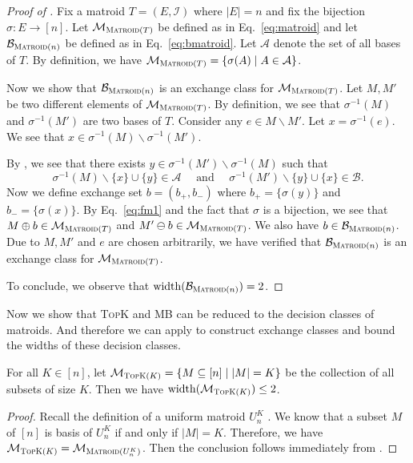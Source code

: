 \documentclass{article}
\newcommand{\M}{\mathcal M}
\newcommand{\B}{\mathcal B}
\newcommand{\del}{\backslash}
\DeclareMathOperator{\rank}{width}
\newcommand{\MultiIdent}{\textsc{TopK}\xspace}
\newcommand{\MultiBandit}{\textsc{MB}\xspace}
\newcommand{\Matroid}{\textsc{Matroid}\xspace}
\begin{document}
\begin{proof}[Proof of ]
Fix a matroid $T=(E,\mathcal I)$ where $|E|=n$ and fix the bijection $\sigma\colon E\rightarrow [n]$.
Let $\M_{\Matroid(T)}$ be defined as in Eq.~\eqref{eq:matroid} and let $\B_{\Matroid(n)}$ be defined as in Eq.~\eqref{eq:bmatroid}.
Let $\mathcal A$ denote the set of all bases of $T$. 
By definition, we have $\M_{\Matroid(T)} = \{\sigma(A) \mid A\in\mathcal A\}$.

Now we show that $\B_{\Matroid(n)}$ is an exchange class for $\M_{\Matroid(T)}$.
Let $M,M'$ be two different elements of $\M_{\Matroid(T)}$. 
By definition, we see that $\sigma^{-1}(M)$ and $\sigma^{-1}(M')$ are two bases of $T$.
Consider any $e\in M\del M'$. Let $x = \sigma^{-1}(e)$. 
We see that $x\in \sigma^{-1}(M) \del \sigma^{-1}(M')$. 

By , we see that there exists $y \in \sigma^{-1}(M') \del \sigma^{-1}(M)$ 
such that 
\begin{equation}
\label{eq:fm1}
\sigma^{-1}(M) \del \{x\} \cup \{y\} \in \mathcal A\quad\text{ and }\quad\sigma^{-1}(M') \del \{y\} \cup \{x\} \in \mathcal B.
\end{equation}
Now we define exchange set $b=(b_+,b_-)$ where $b_+ = \{\sigma(y)\}$ and $b_-=\{\sigma(x)\}$. 
By Eq.~\eqref{eq:fm1} and the fact that $\sigma$ is a bijection, we see that $M\oplus b \in \M_{\Matroid(T)}$ and $M'\ominus b \in \M_{\Matroid(T)}$. We also have $b\in \B_{\Matroid(n)}$.
Due to $M,M'$ and $e$ are chosen arbitrarily, we have verified that $\B_{\Matroid(n)}$ is an exchange class for $\M_{\Matroid(T)}$.

To conclude, we observe that $\rank(\B_{\Matroid(n)}) = 2$.
\end{proof}

Now we show that \MultiIdent and \MultiBandit can be reduced to the decision classes of matroids. 
And therefore we can apply  to construct exchange classes and bound the widths of these decision classes.

\begin{fact}[\MultiIdent]
\label{fact:topk}
For all $K \in [n]$, let $\M_{\MultiIdent(K)} = \{M\subseteq [n] \mid |M| = K\}$ be the collection of all subsets of size $K$.
Then we have $\rank(\M_{\MultiIdent(K)}) \le 2$.
\end{fact}
\begin{proof}
Recall the definition of a uniform matroid $U_n^K$ \citep{oxley2006matroid}. 
We know that a subset $M$ of $[n]$ is basis of $U_n^K$ if and only if $|M|=K$.
Therefore, we have $\M_{\MultiIdent(K)}=\M_{\Matroid(U_n^K)}$. 
Then the conclusion follows immediately from .
\end{proof}
\end{document}
